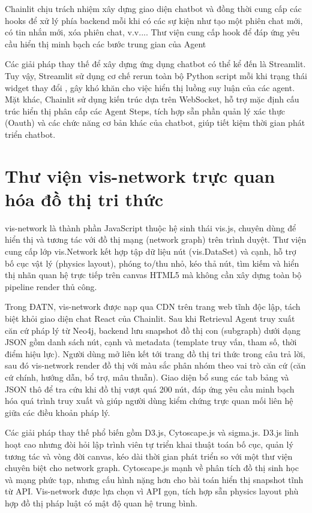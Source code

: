 \documentclass[../DoAn.tex]{subfiles}
\begin{document}
Chainlit chịu trách nhiệm xây dựng giao diện chatbot và đồng thời cung cấp các hooks để xử lý phía backend mỗi khi có các sự kiện như tạo một phiên chat mới, có tin nhắn mới, xóa phiên chat, v.v.... Thư viện cung cấp hook để đáp ứng yêu cầu hiển thị minh bạch các bước trung gian của Agent


Các giải pháp thay thế để xây dựng ứng dụng chatbot có thể kể đến là Streamlit. Tuy vậy, Streamlit sử dụng cơ chế rerun toàn bộ Python script mỗi khi trạng thái widget thay đổi \cite{StreamlitDoc}, gây khó khăn cho việc hiển thị luồng suy luận của các agent. Mặt khác, Chainlit sử dụng kiến trúc dựa trên WebSocket, hỗ trợ mặc định cấu trúc hiển thị phân cấp các Agent Steps, tích hợp sẵn phần quản lý xác thực (Oauth) và các chức năng cơ bản khác của chatbot, giúp tiết kiệm thời gian phát triển chatbot.


\section{Thư viện vis-network trực quan hóa đồ thị tri thức}
\label{section:3.6}


vis-network \cite{vis-networkDoc} là thành phần JavaScript thuộc hệ sinh thái vis.js, chuyên dùng để hiển thị và tương tác với đồ thị mạng (network graph) trên trình duyệt. Thư viện cung cấp lớp vis.Network kết hợp tập dữ liệu nút (vis.DataSet) và cạnh, hỗ trợ bố cục vật lý (physics layout), phóng to/thu nhỏ, kéo thả nút, tìm kiếm và hiển thị nhãn quan hệ trực tiếp trên canvas HTML5 mà không cần xây dựng toàn bộ pipeline render thủ công.


Trong ĐATN, vis-network được nạp qua CDN trên trang web tĩnh độc lập, tách biệt khỏi giao diện chat React của Chainlit. Sau khi Retrieval Agent truy xuất căn cứ pháp lý từ Neo4j, backend lưu snapshot đồ thị con (subgraph) dưới dạng JSON gồm danh sách nút, cạnh và metadata (template truy vấn, tham số, thời điểm hiệu lực). Người dùng mở liên kết tới trang đồ thị tri thức trong câu trả lời, sau đó vis-network render đồ thị với màu sắc phân nhóm theo vai trò căn cứ (căn cứ chính, hướng dẫn, bổ trợ, mâu thuẫn). Giao diện bổ sung các tab bảng và JSON thô để tra cứu khi đồ thị vượt quá 200 nút, đáp ứng yêu cầu minh bạch hóa quá trình truy xuất và giúp người dùng kiểm chứng trực quan mối liên hệ giữa các điều khoản pháp lý.


Các giải pháp thay thế phổ biến gồm D3.js, Cytoscape.js và sigma.js. D3.js linh hoạt cao nhưng đòi hỏi lập trình viên tự triển khai thuật toán bố cục, quản lý tương tác và vòng đời canvas, kéo dài thời gian phát triển so với một thư viện chuyên biệt cho network graph. Cytoscape.js mạnh về phân tích đồ thị sinh học và mạng phức tạp, nhưng cấu hình nặng hơn cho bài toán hiển thị snapshot tĩnh từ API. Vis-network được lựa chọn vì API gọn, tích hợp sẵn physics layout phù hợp đồ thị pháp luật có mật độ quan hệ trung bình.
\end{document}
